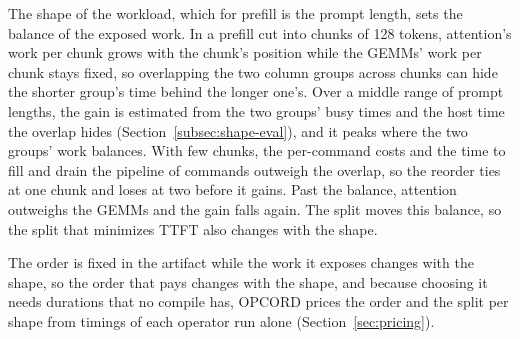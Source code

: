 The shape of the workload, which for prefill is the prompt length, sets the balance of the exposed work.
In a prefill cut into chunks of 128 tokens, attention's work per chunk grows with the chunk's position while the GEMMs' work per chunk stays fixed, so overlapping the two column groups across chunks can hide the shorter group's time behind the longer one's.
Over a middle range of prompt lengths, the gain is estimated from the two groups' busy times and the host time the overlap hides (Section~\ref{subsec:shape-eval}), and it peaks where the two groups' work balances.
With few chunks, the per-command costs and the time to fill and drain the pipeline of commands outweigh the overlap, so the reorder ties at one chunk and loses at two before it gains.
Past the balance, attention outweighs the GEMMs and the gain falls again.
The split moves this balance, so the split that minimizes TTFT also changes with the shape.

The order is fixed in the artifact while the work it exposes changes with the shape, so the order that pays changes with the shape, and because choosing it needs durations that no compile has, OPCORD prices the order and the split per shape from timings of each operator run alone (Section~\ref{sec:pricing}).

